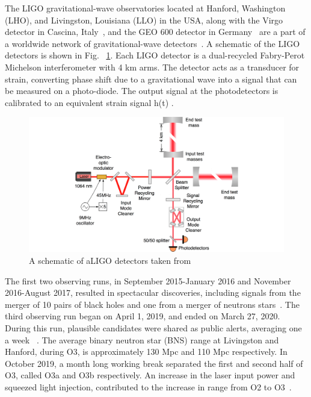 \documentclass[12pt]{iopart}
\begin{document}
The LIGO  gravitational-wave observatories located at Hanford, Washington (LHO), and Livingston, Louisiana (LLO) in the USA, along with the Virgo detector in Cascina, Italy~\cite{virgo}, and the GEO 600 detector in Germany~\cite{german} are a part of a worldwide network of gravitational-wave detectors~\cite{aligo}. 
A schematic of the LIGO detectors is shown in Fig. ~\ref{fig:schematic}.
Each LIGO detector is a dual-recycled Fabry-Perot Michelson interferometer with 4 km arms. The detector acts as a transducer for strain, converting phase shift due to a gravitational wave into a signal that can be measured on a photo-diode. The output signal at the photodetectors is calibrated to an equivalent strain signal h(t) \cite{Abbott_2017,Viets_2018}.
\begin{figure}[h]
    \centering
    \includegraphics[width=12cm]{ligo-schematic.png}
    \caption{A schematic of aLIGO detectors taken from {~\cite{schematic}} }
    \label{fig:schematic}
\end{figure}


The first two observing runs, in September 2015-January 2016 and November 2016-August 2017, resulted in spectacular discoveries, including signals from the merger of 10 pairs of black holes and one from a merger of neutrons stars~\cite{catalogue,firstpaper,neturonpaper}. The third observing run began on April 1, 2019, and ended on March 27, 2020. During this run, plausible candidates were shared as public alerts, averaging one a week ~\cite{gracedb}. The average binary neutron star (BNS) range at Livingston and Hanford, during O3, is approximately 130 Mpc and 110 Mpc respectively. In October 2019, a month long working break separated the first and second half of O3, called O3a and O3b respectively. An increase in the laser input power and squeezed light injection, contributed to the increase in range from O2 to O3~\cite{src,prospect}.
\end{document}
